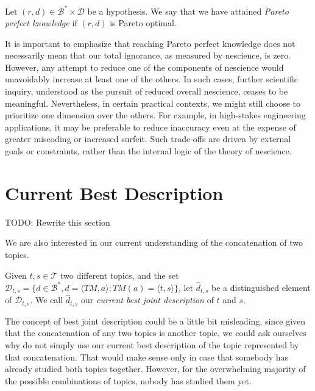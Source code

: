 \begin{definition}
Let $(r, d) \in \mathcal{B}^\ast \times \mathcal{D}$ be a hypothesis. We say that we have attained \emph{Pareto perfect knowledge} if $(r, d)$ is Pareto optimal.
\end{definition}

It is important to emphasize that reaching Pareto perfect knowledge does not necessarily mean that our total ignorance, as measured by nescience, is zero. However, any attempt to reduce one of the components of nescience would unavoidably increase at least one of the others. In such cases, further scientific inquiry, understood as the pursuit of reduced overall nescience, ceases to be meaningful. Nevertheless, in certain practical contexts, we might still choose to prioritize one dimension over the others. For example, in high-stakes engineering applications, it may be preferable to reduce inaccuracy even at the expense of greater miscoding or increased surfeit. Such trade-offs are driven by external goals or constraints, rather than the internal logic of the theory of nescience.

%
%

\section{Current Best Description}

{\color{red} TODO: Rewrite this section}

We are also interested in our current understanding of the concatenation of two topics.

\begin{definition}
Given $t,s \in \mathcal{T}$ two different topics, and the set $\mathcal{D}_{t,s} = \{ d \in \mathcal{B}^\ast, d = \langle TM,a \rangle : TM(a) = \langle t,s \rangle \}$, let $\hat{d}_{t,s}$ be a distinguished element of $\mathcal{D}_{t,s}$. We call $\hat{d}_{t,s}$ our \emph{current best joint description} of $t$ and $s$.
\end{definition}

The concept of best joint description could be a little bit misleading, since given that the concatenation of any two topics is another topic, we could ask ourselves why do not simply use our current best description of the topic represented by that concatenation. That would make sense only in case that somebody has already studied both topics together. However, for the overwhelming majority of the possible combinations of topics, nobody has studied them yet.

